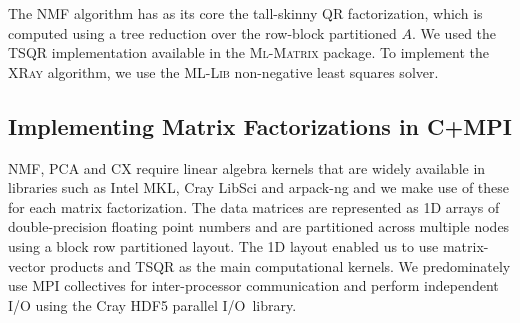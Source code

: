 The NMF algorithm has as its core the tall-skinny QR factorization, which is computed using a tree reduction over the row-block partitioned $A$.
We used the \textsc{TSQR} implementation available in the \textsc{Ml-Matrix} package. To implement the \textsc{XRay} algorithm, we use the \textsc{ML-Lib} non-negative least squares solver.


\subsection{Implementing Matrix Factorizations in C+MPI}
NMF, PCA and CX require linear algebra kernels that are widely available in libraries such as Intel MKL, Cray LibSci and arpack-ng and we make use of these for each matrix factorization. The data matrices are represented as 1D arrays of double-precision floating point numbers and are partitioned across multiple nodes using a block row partitioned layout. The 1D layout enabled us to use matrix-vector products and TSQR as the main computational kernels. We predominately use MPI collectives for inter-processor communication and perform independent I/O using the Cray HDF5 parallel I/O~library.  